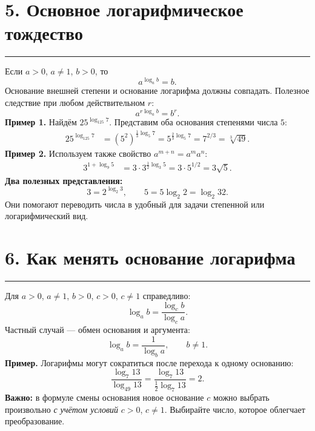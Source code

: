 \documentclass[a4paper,12pt]{article}
\newcommand{\sectionline}{\par\vspace{1pt}\noindent\color{accent}\rule{\linewidth}{0.6pt}\par\color{textgray}\vspace{3pt}}
\begin{document}
\clearpage
\section*{5. Основное логарифмическое тождество}
\sectionline
Если $a>0$, $a\ne1$, $b>0$, то
\[
\boxed{a^{\log_a b}=b}.
\]
Основание внешней степени и основание логарифма должны совпадать. Полезное следствие при любом действительном $r$:
\[
\boxed{a^{r\log_a b}=b^r}.
\]
\textbf{Пример 1.} Найдём $25^{\log_{125}7}$. Представим оба основания степенями числа $5$:
\[
\begin{aligned}
25^{\log_{125}7}
&=\left(5^2\right)^{\frac13\log_5 7}
=5^{\frac23\log_5 7}
=\boxed{7^{2/3}=\sqrt[3]{49}}.
\end{aligned}
\]
\textbf{Пример 2.} Используем также свойство $a^{m+n}=a^m a^n$:
\[
\begin{aligned}
3^{1+\log_9 5}
&=3\cdot3^{\frac12\log_3 5}
=3\cdot5^{1/2}
=\boxed{3\sqrt5}.
\end{aligned}
\]
\textbf{Два полезных представления:}
\[
3=2^{\log_2 3},\qquad
5=5\log_2 2=\log_2 32.
\]
Они помогают переводить числа в удобный для задачи степенной или логарифмический вид.

\section*{6. Как менять основание логарифма}
\sectionline
Для $a>0$, $a\ne1$, $b>0$, $c>0$, $c\ne1$ справедливо:
\[
\boxed{\log_a b=\frac{\log_c b}{\log_c a}}.
\]
Частный случай --- обмен основания и аргумента:
\[
\boxed{\log_a b=\frac{1}{\log_b a}},
\qquad b\ne1.
\]
\textbf{Пример.} Логарифмы могут сократиться после перехода к одному основанию:
\[
\frac{\log_7 13}{\log_{49}13}
=\frac{\log_7 13}{\frac12\log_7 13}
=\boxed{2}.
\]
\textbf{Важно:} в формуле смены основания новое основание $c$ можно выбрать произвольно \emph{с учётом условий} $c>0$, $c\ne1$. Выбирайте число, которое облегчает преобразование.

\clearpage
\end{document}
